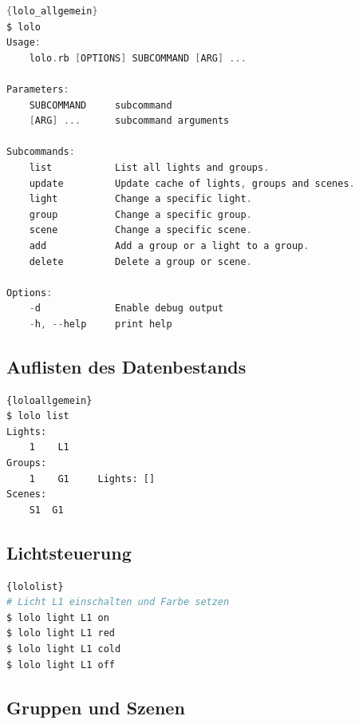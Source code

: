 \documentclass[a4paper,12pt]{article}
\begin{document}
\begin{lstlisting}[caption=Hilfe von \texttt{lolo},
                   basicstyle=\footnotesize\ttfamily,
                   language=C]{lolo_allgemein}
$ lolo
Usage:
    lolo.rb [OPTIONS] SUBCOMMAND [ARG] ...

Parameters:
    SUBCOMMAND     subcommand
    [ARG] ...      subcommand arguments

Subcommands:
    list           List all lights and groups.
    update         Update cache of lights, groups and scenes.
    light          Change a specific light.
    group          Change a specific group.
    scene          Change a specific scene.
    add            Add a group or a light to a group.
    delete         Delete a group or scene.

Options:
    -d             Enable debug output
    -h, --help     print help
\end{lstlisting}

\newpage

\subsection{Auflisten des Datenbestands}

\begin{lstlisting}[caption={Abfrage aller Lichter, Gruppen und Szenen},
                   basicstyle=\footnotesize\ttfamily]{loloallgemein}
$ lolo list
Lights:
	1 	 L1
Groups:
	1 	 G1 	Lights: []
Scenes:
	S1 	G1
\end{lstlisting}

\subsection{Lichtsteuerung}

\begin{lstlisting}[caption=lolo Beispielaufrufe,
                   basicstyle=\footnotesize\ttfamily,language=Bash]{lololist}
# Licht L1 einschalten und Farbe setzen
$ lolo light L1 on
$ lolo light L1 red
$ lolo light L1 cold
$ lolo light L1 off

\end{lstlisting}

\newpage

\subsection{Gruppen und Szenen}
\end{document}
